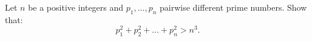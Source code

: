 Let $n$ be a positive integers and $p_1,...,p_n$ pairwise different prime numbers. Show that:
$$p_1^2+p_2^2+\dots + p_n^2 > n^3.$$